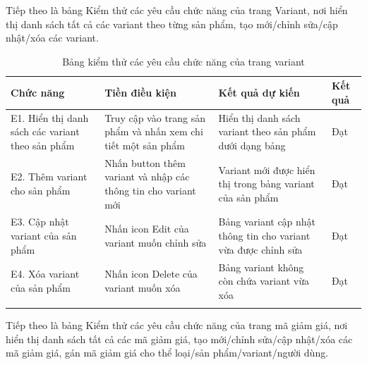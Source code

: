 Tiếp theo là bảng Kiểm thử các yêu cầu chức năng của trang Variant, nơi hiển thị danh sách tất cả các variant theo từng sản phẩm, tạo mới/chỉnh sửa/cập nhật/xóa các variant.
\begin{longtable}{|p{4cm}|p{4cm}|p{4cm}|p{2cm}|}
    \hline
    Chức năng & Tiền điều kiện & Kết quả dự kiến & Kết quả \\
    \hline
    E1. Hiển thị danh sách các variant theo sản phẩm  & Truy cập vào trang sản phẩm và nhấn xem chi tiết một sản phẩm & Hiển thị danh sách variant theo sản phẩm dưới dạng bảng & Đạt\\
    \hline
     E2. Thêm variant cho sản phẩm & Nhấn button thêm variant và nhập các thông tin cho variant mới & Variant mới được hiển thị trong bảng variant của sản phẩm  & Đạt\\
    \hline
     E3. Cập nhật variant của sản phẩm& Nhấn icon Edit của variant muốn chỉnh sửa & Bảng variant cập nhật thông tin cho variant vừa được chỉnh sửa  & Đạt\\
     E4. Xóa variant của sản phẩm & Nhấn icon Delete của variant muốn xóa & Bảng variant không còn chứa variant vừa xóa & Đạt \\
    \hline
    \caption{Bảng kiểm thử các yêu cầu chức năng của trang variant}
\end{longtable}
Tiếp theo là bảng Kiểm thử các yêu cầu chức năng của trang mã giảm giá, nơi hiển thị danh sách tất cả các mã giảm giá, tạo mới/chỉnh sửa/cập nhật/xóa các mã giảm giá, gán mã giảm giá cho thể loại/sản phẩm/variant/người dùng.
